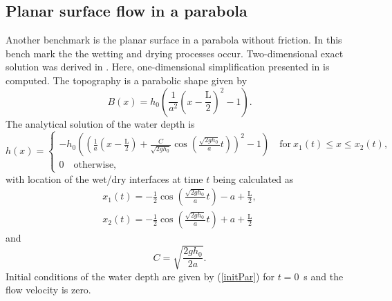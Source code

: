 \subsection{Planar surface flow in a parabola}\label{psp}
Another benchmark is the planar surface in a parabola without friction. In this bench mark the the wetting and drying processes occur. Two-dimensional exact solution was derived in \cite{Thacker2006}. 
Here, one-dimensional simplification presented in \cite{swashe} is computed. 
The topography is a parabolic shape given by 
\begin{equation}
B(x)=h_0 \left( \frac{1}{a^2}\left(x-\frac{\text{L}}{2}
\right)^2-1\right).
\end{equation}
The analytical solution of the water depth is
\begin{equation}\label{initPar}
h(x)=\begin{cases}
-h_0 \left(\left(\frac{1}{a}\left(x-\frac{\text{L}}{2}\right)
+\frac{C}{\sqrt{2gh_0}}\cos\left(\frac{\sqrt{2gh_0}}
{a}t\right)\right)^2-1\right) \quad \text{for} 
\ x_1(t)\leq x\leq x_2(t),\\
0 \quad \text{otherwise},
\end{cases}
\end{equation}
with location of the wet/dry interfaces at time $t$ being calculated as
\begin{equation}
\begin{array}{c}
x_1(t)=-\frac12\cos\left(\frac{\sqrt{2gh_0}}{a}t\right)
-a+\frac{\text{L}}{2},\\
x_2(t)=-\frac12\cos\left(\frac{\sqrt{2gh_0}}{a}t\right)
+a+\frac{\text{L}}{2}
\end{array}
\end{equation}
and 
\begin{equation}
C=\sqrt{\frac{2gh_0}{2a}}.
\end{equation}
Initial conditions of the water depth are given by (\ref{initPar}) for $t=0$~s and the flow velocity is zero.

